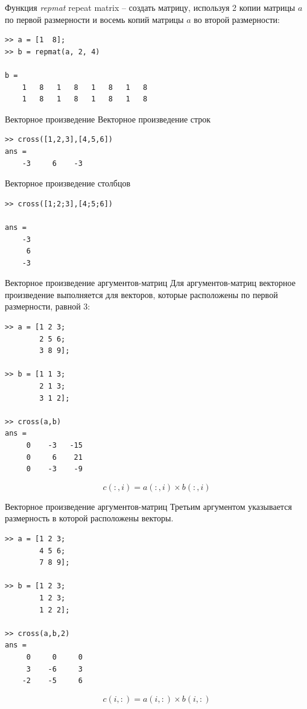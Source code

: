 \documentclass[11pt, compress]{beamer}
\begin{document}
\begin{frame}[fragile]{Функция \emph{repmat}}
\alert{rep}eat \alert{mat}rix -- создать матрицу, используя 2 копии матрицы $a$ по первой размерности и восемь копий матрицы $a$ во второй размерности:
\begin{lstlisting}  
>> a = [1  8];
>> b = repmat(a, 2, 4)

b = 
    1   8   1   8   1   8   1   8 
    1   8   1   8   1   8   1   8 
\end{lstlisting}
\end{frame}

\begin{frame}[fragile]{Векторное произведение}
Векторное произведение строк  
\begin{lstlisting}
>> cross([1,2,3],[4,5,6])
ans =
    -3     6    -3
\end{lstlisting}

Векторное произведение столбцов
\begin{lstlisting}
>> cross([1;2;3],[4;5;6])

ans =
    -3
     6
    -3    
\end{lstlisting}
\end{frame}

\begin{frame}[fragile]{Векторное произведение аргументов-матриц}
Для аргументов-матриц векторное произведение выполняется для векторов, которые расположены по первой размерности, равной 3:  
\begin{lstlisting}
>> a = [1 2 3;
        2 5 6; 
        3 8 9];

>> b = [1 1 3; 
        2 1 3; 
        3 1 2];     

>> cross(a,b)
ans =
     0    -3   -15
     0     6    21
     0    -3    -9
\end{lstlisting}

$$
  c(:,i) = a(:,i) \times b(:,i)
$$
\end{frame}

\begin{frame}[fragile]{Векторное произведение аргументов-матриц}
Третьим аргументом указывается размерность в которой расположены векторы.  
\begin{lstlisting}
>> a = [1 2 3;
        4 5 6; 
        7 8 9];

>> b = [1 2 3; 
        1 2 3; 
        1 2 2];     

>> cross(a,b,2)
ans =
     0     0     0
     3    -6     3
    -2    -5     6
\end{lstlisting}

$$
  c(i,:) = a(i,:) \times b(i,:)
$$
\end{frame}
\end{document}
